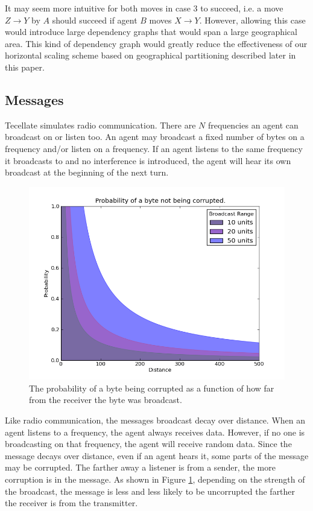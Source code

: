 It may seem more intuitive for both moves in case 3 to succeed, i.e. a move $Z\rightarrow Y$ by $A$
should succeed if agent $B$ moves $X\rightarrow Y$. However, allowing this case would introduce
large dependency graphs that would span a large geographical area. This kind of dependency graph
would greatly reduce the effectiveness of our horizontal scaling scheme based on geographical
partitioning described later in this paper.

\subsection{Messages}

Tecellate simulates radio communication. There are $N$ frequencies an agent can broadcast on or
listen too. An agent may broadcast a fixed number of bytes on a frequency and/or listen on a
frequency. If an agent listens to the same frequency it broadcasts to and no interference is
introduced, the agent will hear its own broadcast at the beginning of the next turn.

\begin{figure}[h!]
    \begin{center}
        \includegraphics[width=6in]{figures/corrupt.png}
    \end{center}
    \caption{The probability of a byte being corrupted as a function of how far from the receiver
        the byte was broadcast.}
    \label{corrupt}
\end{figure}

Like radio communication, the messages broadcast decay over distance. When an agent listens to a
frequency, the agent always receives data. However, if no one is broadcasting on that frequency, the
agent will receive random data. Since the message decays over distance, even if an agent hears it,
some parts of the message may be corrupted. The farther away a listener is from a sender, the more
corruption is in the message. As shown in Figure \ref{corrupt}, depending on the strength of the
broadcast, the message is less and less likely to be uncorrupted the farther the receiver is from
the transmitter.


